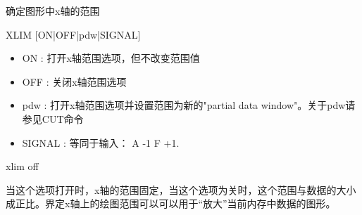 \label{cmd:xlim}

确定图形中x轴的范围

\begin{SACSTX}
XLIM [ON|OFF|pdw|SIGNAL]
\end{SACSTX}

\begin{itemize}
\item ON : 打开x轴范围选项，但不改变范围值 
\item OFF : 关闭x轴范围选项 
\item pdw : 打开x轴范围选项并设置范围为新的"partial data window"。关于pdw请参见CUT命令 
\item SIGNAL : 等同于输入： A -1 F +1. 
\end{itemize}

\begin{SACDFT}
xlim off
\end{SACDFT}

当这个选项打开时，x轴的范围固定，当这个选项为关时，这个范围与数据的大小成正比。界定x轴上的绘图范围可以可以用于``放大''当前内存中数据的图形。

